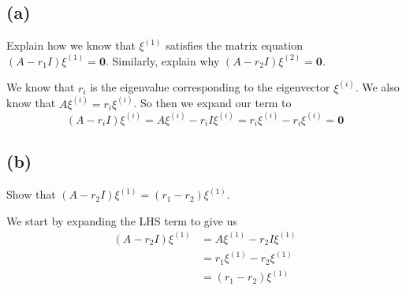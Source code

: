 \documentclass{article}
\theoremstyle{definition}
\begin{document}
    \subsection*{(a)}
        \begin{mdframed}[]
            Explain how we know that $\xi^{(1)}$ satisfies the matrix 
            equation $(A - r_1 I)\xi^{(1)} = \bm 0$. Similarly, explain why 
            $(A - r_2I)\xi^{(2)} = \bm 0$.
        \end{mdframed}
        We know that $r_i$ is the eigenvalue corresponding to the eigenvector $\xi^{(i)}$.
        We also know that $A \xi^{(i)} = r_i \xi^{(i)}$. So then we expand our term to 
        \[
            (A - r_i I)\xi^{(i)} = A\xi^{(i)} - r_i I\xi^{(i)} = r_i \xi^{(i)} - r_i \xi^{(i)} = \bm 0
        \]
    \subsection*{(b)}
        \begin{mdframed}[]
            Show that $(A - r_2I)\xi^{(1)} = (r_1 - r_2)\xi^{(1)}$.
        \end{mdframed}
        We start by expanding the LHS term to give us 
        \begin{align*}
            (A - r_2I) \xi^{(1)} &= A \xi^{(1)} - r_2I\xi^{(1)} \\
            &= r_1 \xi^{(1)} - r_2 \xi^{(1)}\\
            &=(r_1 - r_2) \xi^{(1)}
        \end{align*}
\end{document}

